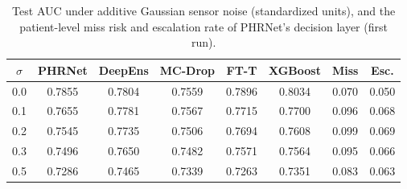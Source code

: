 \begin{table}[t]
\centering
\caption{Test AUC under additive Gaussian sensor noise (standardized units), and the patient-level miss risk and escalation rate of PHRNet's decision layer (first run).}
\label{tab:noise}
\footnotesize
\setlength{\tabcolsep}{2.5pt}
\begin{tabular}{cccccccc}
\toprule
$\sigma$ & PHRNet & DeepEns & MC-Drop & FT-T & XGBoost & Miss & Esc. \\
\midrule
0.0 & 0.7855 & 0.7804 & 0.7559 & 0.7896 & 0.8034 & 0.070 & 0.050 \\
0.1 & 0.7655 & 0.7781 & 0.7567 & 0.7715 & 0.7700 & 0.096 & 0.068 \\
0.2 & 0.7545 & 0.7735 & 0.7506 & 0.7694 & 0.7608 & 0.099 & 0.069 \\
0.3 & 0.7496 & 0.7650 & 0.7482 & 0.7571 & 0.7564 & 0.095 & 0.066 \\
0.5 & 0.7286 & 0.7465 & 0.7339 & 0.7263 & 0.7351 & 0.083 & 0.063 \\
\bottomrule
\end{tabular}
\end{table}